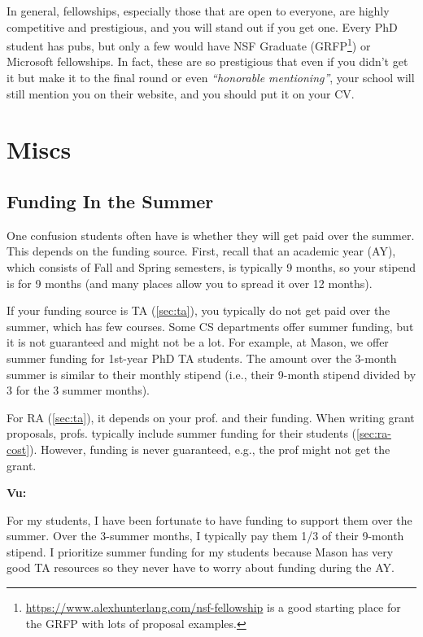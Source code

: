 \documentclass[oneside,11pt,dvipsnames]{book}
\newenvironment{commentbox}[1][]{
  \small
  \begin{mybox}
    {\small \textbf{#1}}
  }{
  \end{mybox}
}
\begin{document}
In general, fellowships, especially those that are open to everyone, are highly competitive and prestigious, and you will stand out if you get one.  Every PhD student has pubs, but only a few would have NSF Graduate (GRFP\footnote{\url{https://www.alexhunterlang.com/nsf-fellowship} is a good starting place for the GRFP with lots of proposal examples.}) or Microsoft fellowships. In fact, these are so prestigious that even if you didn't get it but make it to the final round or even \emph{``honorable mentioning''}, your school will still mention you on their website, and you should put it on your CV.

\section{Miscs}

\subsection{Funding In the Summer}\label{sec:summer-funding}

One confusion students often have is whether they will get paid over the summer.  This depends on the funding source.
First, recall that an academic year (AY), which consists of Fall and Spring semesters, is typically 9 months, so your stipend is for 9 months (and many places allow you to spread it over 12 months).

If your funding source is TA (\autoref{sec:ta}), you typically do not get paid over the summer, which has few courses.
Some CS departments offer summer funding, but it is not guaranteed and might not be a lot. For example, at Mason, we offer summer funding for 1st-year PhD TA students. The amount over the 3-month summer is similar to their monthly stipend (i.e., their 9-month stipend divided by 3 for the 3 summer months).

For RA (\autoref{sec:ta}), it depends on your prof. and their funding. When writing grant proposals, profs. typically include summer funding for their students (\autoref{sec:ra-cost}). However, funding is never guaranteed, e.g., the prof might not get the grant.

\begin{commentbox}[Vu:]
For my students, I have been fortunate to have funding to support them over the summer. Over the 3-summer months, I typically pay them 1/3 of their 9-month stipend. I prioritize summer funding for my students because Mason has very good TA resources so they never have to worry about funding during the AY.
\end{commentbox}
\end{document}
